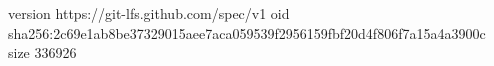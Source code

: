 version https://git-lfs.github.com/spec/v1
oid sha256:2c69e1ab8be37329015aee7aca059539f2956159fbf20d4f806f7a15a4a3900c
size 336926
